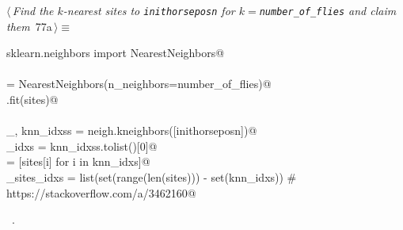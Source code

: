\documentclass[11.5pt]{report}
\begin{document}
\begin{flushleft} \small\label{scrap115}\raggedright\small
{} $\langle\,${\itshape Find the $k$-nearest sites to \verb|inithorseposn| for $k=$\verb|number_of_flies| and claim them}\nobreak\ {\footnotesize {77a}}$\,\rangle\equiv$
\vspace{-1ex}
\begin{list}{}{} \item
\mbox{}\verb@from sklearn.neighbors import NearestNeighbors@\\
\mbox{}\verb@@\\
\mbox{}\verb@neigh = NearestNeighbors(n_neighbors=number_of_flies)@\\
\mbox{}\verb@neigh.fit(sites)@\\
\mbox{}\verb@@\\
\mbox{}\verb@_, knn_idxss = neigh.kneighbors([inithorseposn])@\\
\mbox{}\verb@knn_idxs     = knn_idxss.tolist()[0]@\\
\mbox{}\verb@knns         = [sites[i] for i in knn_idxs]@\\
\mbox{}\verb@unclaimed_sites_idxs = list(set(range(len(sites))) - set(knn_idxs)) # https://stackoverflow.com/a/3462160@\\
\mbox{}\verb@@{\NWsep}
\end{list}
\vspace{-1.5ex}
\footnotesize
\begin{list}{}{\setlength{\itemsep}{-\parsep}\setlength{\itemindent}{-\leftmargin}}
\item \NWtxtMacroRefIn\ .

\item{}
\end{list}
\vspace{4ex}
\end{flushleft}
\end{document}
